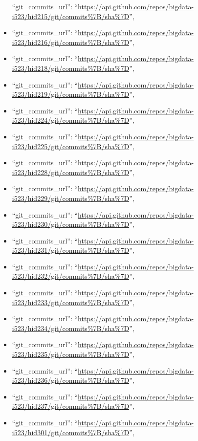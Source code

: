 \begin{itemize}
  ``git\_commits\_url'':
  ``\url{https://api.github.com/repos/bigdata-i523/hid215/git/commits\%7B/sha\%7D}'',
\item
  ``git\_commits\_url'':
  ``\url{https://api.github.com/repos/bigdata-i523/hid216/git/commits\%7B/sha\%7D}'',
\item
  ``git\_commits\_url'':
  ``\url{https://api.github.com/repos/bigdata-i523/hid218/git/commits\%7B/sha\%7D}'',
\item
  ``git\_commits\_url'':
  ``\url{https://api.github.com/repos/bigdata-i523/hid219/git/commits\%7B/sha\%7D}'',
\item
  ``git\_commits\_url'':
  ``\url{https://api.github.com/repos/bigdata-i523/hid224/git/commits\%7B/sha\%7D}'',
\item
  ``git\_commits\_url'':
  ``\url{https://api.github.com/repos/bigdata-i523/hid225/git/commits\%7B/sha\%7D}'',
\item
  ``git\_commits\_url'':
  ``\url{https://api.github.com/repos/bigdata-i523/hid228/git/commits\%7B/sha\%7D}'',
\item
  ``git\_commits\_url'':
  ``\url{https://api.github.com/repos/bigdata-i523/hid229/git/commits\%7B/sha\%7D}'',
\item
  ``git\_commits\_url'':
  ``\url{https://api.github.com/repos/bigdata-i523/hid230/git/commits\%7B/sha\%7D}'',
\item
  ``git\_commits\_url'':
  ``\url{https://api.github.com/repos/bigdata-i523/hid231/git/commits\%7B/sha\%7D}'',
\item
  ``git\_commits\_url'':
  ``\url{https://api.github.com/repos/bigdata-i523/hid232/git/commits\%7B/sha\%7D}'',
\item
  ``git\_commits\_url'':
  ``\url{https://api.github.com/repos/bigdata-i523/hid233/git/commits\%7B/sha\%7D}'',
\item
  ``git\_commits\_url'':
  ``\url{https://api.github.com/repos/bigdata-i523/hid234/git/commits\%7B/sha\%7D}'',
\item
  ``git\_commits\_url'':
  ``\url{https://api.github.com/repos/bigdata-i523/hid235/git/commits\%7B/sha\%7D}'',
\item
  ``git\_commits\_url'':
  ``\url{https://api.github.com/repos/bigdata-i523/hid236/git/commits\%7B/sha\%7D}'',
\item
  ``git\_commits\_url'':
  ``\url{https://api.github.com/repos/bigdata-i523/hid237/git/commits\%7B/sha\%7D}'',
\item
  ``git\_commits\_url'':
  ``\url{https://api.github.com/repos/bigdata-i523/hid301/git/commits\%7B/sha\%7D}'',

\end{itemize}
